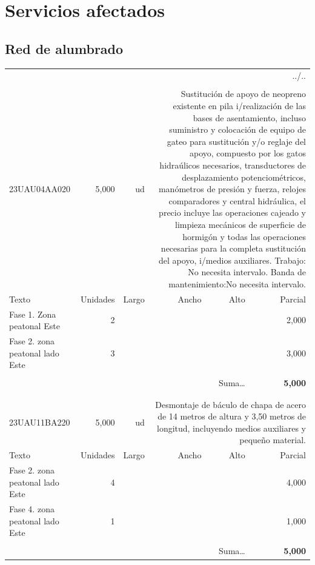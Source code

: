 \documentclass{book}%
\begin{document}
%
\section{Servicios afectados}%
\subsection{Red de alumbrado}%
\begin{longtable}{lrrrrr}%
\multicolumn{6}{r}{../..}\\%
\endfoot%
\endlastfoot%
&&&&&\\%
23UAU04AA020&     5,000& ud&\multicolumn{3}{p{6cm}}{\scriptsize Sustitución de apoyo de neopreno existente en pila i/realización de las bases de asentamiento, incluso suministro y colocación de equipo de gateo para sustitución y/o reglaje del apoyo, compuesto por los gatos hidraúlicos necesarios, transductores de desplazamiento potenciométricos, manómetros de presión y fuerza, relojes comparadores y central hidráulica, el precio incluye las operaciones cajeado y limpieza mecánicos de superficie de hormigón y todas las operaciones necesarias para la completa sustitución del apoyo, i/medios auxiliares. Trabajo: No necesita intervalo. Banda de mantenimiento:No necesita intervalo.\normalsize}\\%
Texto&Unidades&Largo&Ancho&Alto&Parcial\\%
\hline%
\multicolumn{1}{p{3.5cm}}{Fase 1. Zona peatonal Este}&2&&&&     2,000\\%
\multicolumn{1}{p{3.5cm}}{Fase 2.  zona peatonal lado Este}&3&&&&     3,000\\%
&&&&&\\%
\multicolumn{5}{r}{Suma\ldots}&\textbf{     5,000}\\%
\hline%
&&&&&\\%
&&&&&\\%
23UAU11BA220&     5,000& ud&\multicolumn{3}{p{6cm}}{\scriptsize Desmontaje de báculo de chapa de acero de 14 metros de altura y 3,50 metros de longitud, incluyendo medios auxiliares y pequeño material.\normalsize}\\%
Texto&Unidades&Largo&Ancho&Alto&Parcial\\%
\hline%
\multicolumn{1}{p{3.5cm}}{Fase 2.  zona peatonal lado Este}&4&&&&     4,000\\%
\multicolumn{1}{p{3.5cm}}{Fase 4.  zona peatonal lado Este}&1&&&&     1,000\\%
&&&&&\\%
\multicolumn{5}{r}{Suma\ldots}&\textbf{     5,000}\\%

\end{longtable}
\end{document}
